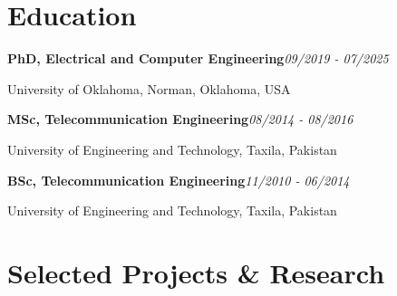 \documentclass[9pt,letterpaper]{extarticle}
\newcommand{\entry}[2]{\Needspace{4\baselineskip}\textbf{#1}\hfill\textit{#2}\par}
\begin{document}
\section{Education}
\entry{PhD, Electrical and Computer Engineering}{09/2019 - 07/2025}
University of Oklahoma, Norman, Oklahoma, USA\par
\entry{MSc, Telecommunication Engineering}{08/2014 - 08/2016}
University of Engineering and Technology, Taxila, Pakistan\par
\entry{BSc, Telecommunication Engineering}{11/2010 - 06/2014}
University of Engineering and Technology, Taxila, Pakistan\par
{}
\section{Selected Projects \& Research}
\end{document}
